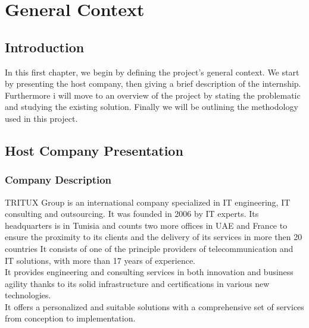 \documentclass[11pt, a4paper]{report}
\begin{document}
    \newpage
      \tableofcontents

    \newpage
      \listoftables

    \newpage
      \listoffigures
    
    \newpage
      \thispagestyle{plain}   %
      
      \chapter[ General Context]{General Context} 

        \section{Introduction}
          In this first chapter, we begin by defining the project's general context. We start by presenting the host company, then giving a brief description of the internship. Furthermore i will move to an overview of the project by stating the problematic and studying the existing solution. Finally we will be outlining the methodology used in this project.
        \section{Host Company Presentation}
          \subsection{Company Description}
            TRITUX Group is an international company specialized in IT engineering, IT consulting and outsourcing. It was founded in 2006 by IT experts. Its headquarters is in Tunisia and counts two more offices in UAE and France to ensure the proximity to its clients and the delivery of its services in more then 20 countries  It consists of one of the principle providers of telecommunication and IT solutions, with more than 17 years of experience.
            \\It provides engineering and consulting services in both innovation and business agility thanks to its solid infrastructure and certifications in various new technologies.
            \\It offers a personalized and suitable solutions with a comprehensive set of services from conception to implementation.
\end{document}
